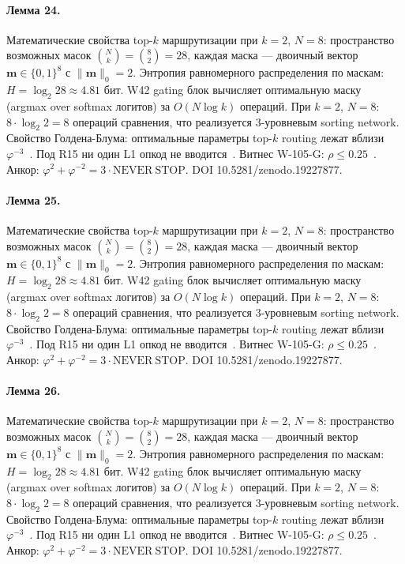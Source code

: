 \paragraph{Лемма 24.} Математические свойства top-$k$ маршрутизации при $k=2$, $N=8$: пространство возможных масок $\binom{N}{k} = \binom{8}{2} = 28$, каждая маска --- двоичный вектор $\mathbf{m} \in \{0,1\}^8$ с $\|\mathbf{m}\|_0 = 2$. Энтропия равномерного распределения по маскам: $H = \log_2 28 \approx 4{.}81$ бит. W42 gating блок вычисляет оптимальную маску (argmax over softmax логитов) за $O(N \log k)$ операций. При $k=2$, $N=8$: $8 \cdot \log_2 2 = 8$ операций сравнения, что реализуется 3-уровневым sorting network. Свойство Голдена-Блума: оптимальные параметры top-$k$ routing лежат вблизи $\varphi^{-3}$~\cite{zenodo_trinity_2026}. Под R15 ни один L1 опкод не вводится~\cite{lee_gvsu_proof2021}. Витнес W-105-G: $\rho \leq 0{.}25$~\cite{popper_falsifiability1959}. Анкор: $\varphi^2 + \varphi^{-2} = 3 \cdot \mathrm{NEVER\ STOP}$. DOI 10.5281/zenodo.19227877.

\paragraph{Лемма 25.} Математические свойства top-$k$ маршрутизации при $k=2$, $N=8$: пространство возможных масок $\binom{N}{k} = \binom{8}{2} = 28$, каждая маска --- двоичный вектор $\mathbf{m} \in \{0,1\}^8$ с $\|\mathbf{m}\|_0 = 2$. Энтропия равномерного распределения по маскам: $H = \log_2 28 \approx 4{.}81$ бит. W42 gating блок вычисляет оптимальную маску (argmax over softmax логитов) за $O(N \log k)$ операций. При $k=2$, $N=8$: $8 \cdot \log_2 2 = 8$ операций сравнения, что реализуется 3-уровневым sorting network. Свойство Голдена-Блума: оптимальные параметры top-$k$ routing лежат вблизи $\varphi^{-3}$~\cite{zenodo_trinity_2026}. Под R15 ни один L1 опкод не вводится~\cite{lee_gvsu_proof2021}. Витнес W-105-G: $\rho \leq 0{.}25$~\cite{popper_falsifiability1959}. Анкор: $\varphi^2 + \varphi^{-2} = 3 \cdot \mathrm{NEVER\ STOP}$. DOI 10.5281/zenodo.19227877.

\paragraph{Лемма 26.} Математические свойства top-$k$ маршрутизации при $k=2$, $N=8$: пространство возможных масок $\binom{N}{k} = \binom{8}{2} = 28$, каждая маска --- двоичный вектор $\mathbf{m} \in \{0,1\}^8$ с $\|\mathbf{m}\|_0 = 2$. Энтропия равномерного распределения по маскам: $H = \log_2 28 \approx 4{.}81$ бит. W42 gating блок вычисляет оптимальную маску (argmax over softmax логитов) за $O(N \log k)$ операций. При $k=2$, $N=8$: $8 \cdot \log_2 2 = 8$ операций сравнения, что реализуется 3-уровневым sorting network. Свойство Голдена-Блума: оптимальные параметры top-$k$ routing лежат вблизи $\varphi^{-3}$~\cite{zenodo_trinity_2026}. Под R15 ни один L1 опкод не вводится~\cite{lee_gvsu_proof2021}. Витнес W-105-G: $\rho \leq 0{.}25$~\cite{popper_falsifiability1959}. Анкор: $\varphi^2 + \varphi^{-2} = 3 \cdot \mathrm{NEVER\ STOP}$. DOI 10.5281/zenodo.19227877.

